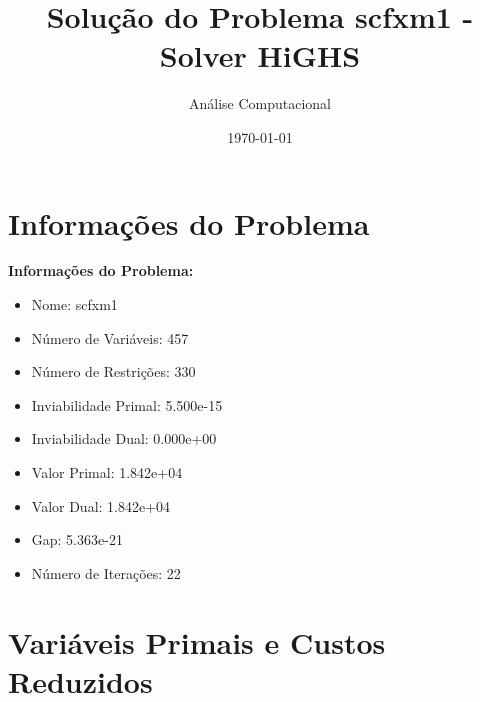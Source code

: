 \documentclass[12pt]{article}
\title{Solução do Problema scfxm1 - Solver HiGHS}
\author{Análise Computacional}
\date{\today}
\begin{document}
\maketitle

\section{Informações do Problema}

\textbf{Informações do Problema:}
\begin{itemize}
\item Nome: scfxm1
\item Número de Variáveis: 457
\item Número de Restrições: 330
\item Inviabilidade Primal: 5.500e-15
\item Inviabilidade Dual: 0.000e+00
\item Valor Primal: 1.842e+04
\item Valor Dual: 1.842e+04
\item Gap: 5.363e-21
\item Número de Iterações: 22
\end{itemize}


\section{Variáveis Primais e Custos Reduzidos}
\end{document}
